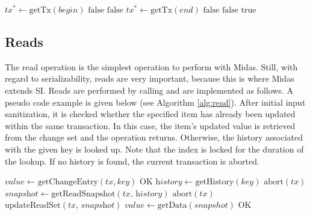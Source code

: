 \begin{algorithm}
\begin{algorithmic}[1]
\State $\textit{tx}^{*} \gets \text{getTx}(\textit{begin})$
\State \Return $\text{false}$
\EndIf
\Else
{}
\State \Return $\text{false}$
\EndIf
\EndIf
\State
{}
\State $\textit{tx}^{*} \gets \text{getTx}(\textit{end})$
\State \Return $\text{false}$
\EndIf
\Else
{}
\State \Return $\text{false}$
\EndIf
\EndIf
\State \Return $\text{true}$
\EndProcedure
\end{algorithmic}
\caption{}
\label{alg:vsb}
\end{algorithm}

\vfill

\subsection{Reads}

The read operation is the simplest operation to perform with Midas. Still, with regard to serializability, reads are very important, because this is where Midas extends SI. Reads are performed by calling  and are implemented as follows. A pseudo code example is given below (see Algorithm \ref{alg:read}). After initial input sanitization, it is checked whether the specified item has already been updated within the same transaction. In this case, the item's updated value is retrieved from the change set and the operation returns. Otherwise, the history associated with the given key is looked up. Note that the index is locked for the duration of the lookup. If no history is found, the current transaction is aborted.

\begin{algorithm}[!ht]
\begin{algorithmic}[1]
\State $\textit{value} \gets \text{getChangeEntry}(tx, key)$
\State \Return $\text{OK}$
\EndIf
\State $\textit{history} \gets \text{getHistory}(\textit{key})$
\State \Return $\text{abort}(tx)$
\EndIf
\State $\textit{snapshot} \gets \text{getReadSnapshot}(\textit{tx, history})$
\State \Return $\text{abort}(tx)$
\EndIf
\State $\text{updateReadSet}(\textit{tx, snapshot})$
\State $\textit{value} \gets \text{getData}(snapshot)$
\State \Return $\text{OK}$
\EndProcedure
\end{algorithmic}
\caption{}
\label{alg:read}
\end{algorithm}

